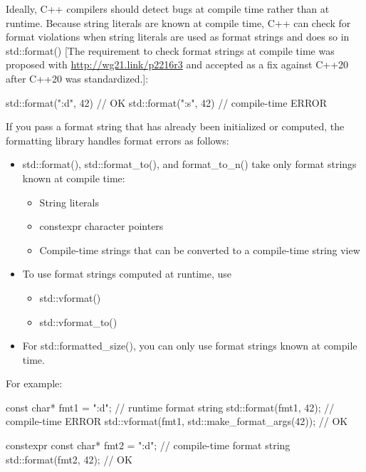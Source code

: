 Ideally, C++ compilers should detect bugs at compile time rather than at runtime. Because string literals are known at compile time, C++ can check for format violations when string literals are used as format strings and does so in std::format() [The requirement to check format strings at compile time was proposed with \url{http://wg21.link/p2216r3} and accepted as a fix against C++20 after C++20 was standardized.]:

\begin{cpp}
std::format("{:d}", 42) // OK
std::format("{:s}", 42) // compile-time ERROR
\end{cpp}

If you pass a format string that has already been initialized or computed, the formatting library handles format errors as follows:

\begin{itemize}
\item
std::format(), std::format\_to(), and format\_to\_n() take only format strings known at compile time:

\begin{itemize}
\item
String literals

\item
constexpr character pointers

\item
Compile-time strings that can be converted to a compile-time string view
\end{itemize}

\item
To use format strings computed at runtime, use

\begin{itemize}
\item
std::vformat()

\item
std::vformat\_to()
\end{itemize}

\item
For std::formatted\_size(), you can only use format strings known at compile time.
\end{itemize}

For example:

\begin{cpp}
const char* fmt1 = "{:d}"; // runtime format string
std::format(fmt1, 42); // compile-time ERROR
std::vformat(fmt1, std::make_format_args(42)); // OK

constexpr const char* fmt2 = "{:d}"; // compile-time format string
std::format(fmt2, 42); // OK
\end{cpp}

